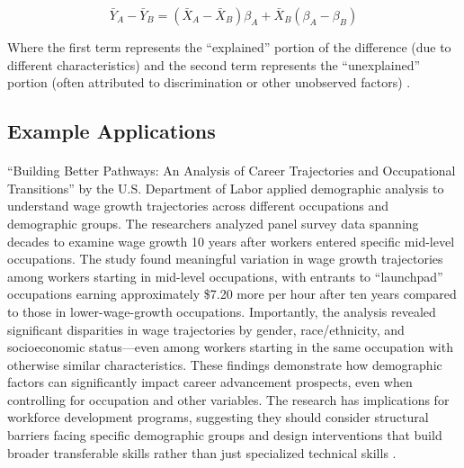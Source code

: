\documentclass[../main.tex]{subfiles}
\begin{document}
\begin{equation}
\bar{Y}_A - \bar{Y}_B = (\bar{X}_A - \bar{X}_B)\beta_A + \bar{X}_B(\beta_A - \beta_B)
\end{equation}

Where the first term represents the ``explained'' portion of the difference (due to different characteristics) and the second term represents the ``unexplained'' portion (often attributed to discrimination or other unobserved factors) \citep{dol2023building, baker2023demographic}.

\subsection{Example Applications}

\paragraph{} ``Building Better Pathways: An Analysis of Career Trajectories and Occupational Transitions'' by the U.S. Department of Labor applied demographic analysis to understand wage growth trajectories across different occupations and demographic groups. The researchers analyzed panel survey data spanning decades to examine wage growth 10 years after workers entered specific mid-level occupations. The study found meaningful variation in wage growth trajectories among workers starting in mid-level occupations, with entrants to ``launchpad'' occupations earning approximately \$7.20 more per hour after ten years compared to those in lower-wage-growth occupations. Importantly, the analysis revealed significant disparities in wage trajectories by gender, race/ethnicity, and socioeconomic status—even among workers starting in the same occupation with otherwise similar characteristics. These findings demonstrate how demographic factors can significantly impact career advancement prospects, even when controlling for occupation and other variables. The research has implications for workforce development programs, suggesting they should consider structural barriers facing specific demographic groups and design interventions that build broader transferable skills rather than just specialized technical skills \citep{dol2023building}.
\end{document}
